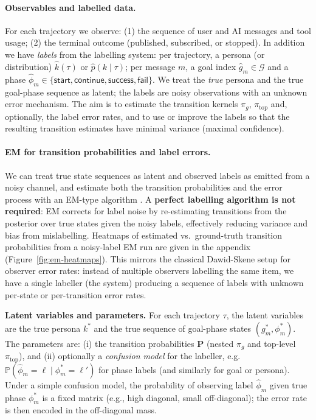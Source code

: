 \paragraph{Observables and labelled data.}
For each trajectory we observe: (1) the sequence of user and AI messages and tool usage; (2) the terminal outcome (published, subscribed, or stopped). In addition we have \emph{labels} from the labelling system: per trajectory, a persona (or distribution) $\widehat{k}(\tau)$ or $\widehat{p}(k \mid \tau)$; per message $m$, a goal index $\widehat{g}_m \in \mathcal{G}$ and a phase $\widehat{\phi}_m \in \{\mathsf{start},\mathsf{continue},\mathsf{success},\mathsf{fail}\}$. We treat the \emph{true} persona and the true goal-phase sequence as latent; the labels are noisy observations with an unknown error mechanism. The aim is to estimate the transition kernels $\pi_g$, $\pi_{\mathrm{top}}$ and, optionally, the label error rates, and to use or improve the labels so that the resulting transition estimates have minimal variance (maximal confidence).

\paragraph{EM for transition probabilities and label errors.}
We can treat true state sequences as latent and observed labels as emitted from a noisy channel, and estimate both the transition probabilities and the error process with an EM-type algorithm \citep{dawid1979maximum}. A \textbf{perfect labelling algorithm is not required}: EM corrects for label noise by re-estimating transitions from the posterior over true states given the noisy labels, effectively reducing variance and bias from mislabelling. Heatmaps of estimated vs.\ ground-truth transition probabilities from a noisy-label EM run are given in the appendix (Figure~\ref{fig:em-heatmaps}). This mirrors the classical Dawid-Skene setup for observer error rates: instead of multiple observers labelling the same item, we have a single labeller (the system) producing a sequence of labels with unknown per-state or per-transition error rates.

\textbf{Latent variables and parameters.} For each trajectory $\tau$, the latent variables are the true persona $k^*$ and the true sequence of goal-phase states $(g^*_m, \phi^*_m)$. The parameters are: (i) the transition probabilities $\mathbf{P}$ (nested $\pi_g$ and top-level $\pi_{\mathrm{top}}$), and (ii) optionally a \emph{confusion model} for the labeller, e.g.\ $\mathbb{P}(\widehat{\phi}_m = \ell \mid \phi^*_m = \ell')$ for phase labels (and similarly for goal or persona). Under a simple confusion model, the probability of observing label $\widehat{\phi}_m$ given true phase $\phi^*_m$ is a fixed matrix (e.g., high diagonal, small off-diagonal); the error rate is then encoded in the off-diagonal mass.

